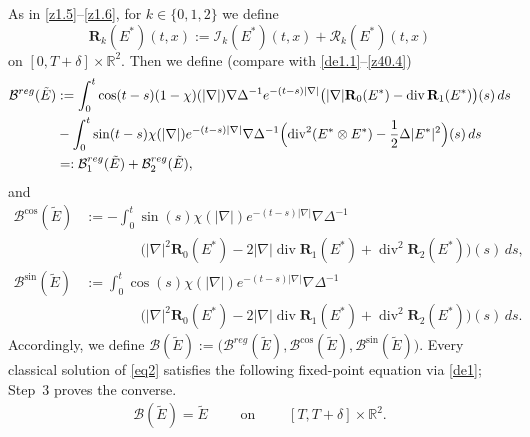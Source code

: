 \documentclass[reqno,11pt]{amsart}
\numberwithin{equation}{section}
\begin{document}
	As in \eqref{z1.5}--\eqref{z1.6}, for $k\in\{0,1,2\}$ we define
	\begin{equation}\label{sec7eq7}
		\mathbf{R}_k(E^\ast)(t,x):=\mathcal{I}_k(E^\ast)(t,x)+\mathcal{R}_k(E^\ast)(t,x)
	\end{equation}
	on $[0,T+\delta]\times\mathbb{R}^2$. Then we define (compare with \eqref{de1.1}--\eqref{z40.4})
	\begin{equation}\label{sec7eq8}
	\begin{split}
		\mathcal{B}^{reg}(\tilde E)&:=
		\int_0^t \cos(t-s)(1-\chi)(|\nabla|)\nabla\Delta^{-1}e^{-(t-s)|\nabla|}
		\bigl(|\nabla|\mathbf{R}_0(E^\ast)-\operatorname{div}\mathbf{R}_1(E^\ast)\bigr)(s)\,ds\\
		&-\int_0^t \sin(t-s)\chi(|\nabla|)e^{-(t-s)|\nabla|}\nabla\Delta^{-1}
		\Bigl(\operatorname{div}^2(E^\ast\otimes E^\ast)-\frac12\Delta |E^\ast|^2\Bigr)(s)\,ds\\
		&=:	\mathcal{B}_1^{reg}(\tilde E)+	\mathcal{B}^{reg}_2(\tilde E),
		\end{split}
	\end{equation}
	and
	\begin{equation}\label{sec7eq9}
		\begin{split}
			\mathcal{B}^{\cos}(\tilde E)&:=-\int_{0}^{t}\sin(s)\chi(|\nabla|)e^{-(t-s)|\nabla|} \nabla\Delta^{-1}\\
			&\qquad\qquad\bigl(|\nabla|^2\mathbf{R}_0( E^\ast)
			-2|\nabla|\operatorname{div}\mathbf{R}_1( E^\ast)
			+\operatorname{div}^2\mathbf{R}_2( E^\ast)\bigr)(s)\,ds,\\
			\mathcal{B}^{\sin}(\tilde E)&:=\int_{0}^{t}\cos(s)\chi(|\nabla|)e^{-(t-s)|\nabla|} \nabla\Delta^{-1}\\
			&\qquad\qquad\bigl(|\nabla|^2\mathbf{R}_0( E^\ast)
			-2|\nabla|\operatorname{div}\mathbf{R}_1( E^\ast)
			+\operatorname{div}^2\mathbf{R}_2( E^\ast)\bigr)(s)\,ds.
		\end{split}
	\end{equation}
	Accordingly, we define $\mathcal{B}(\tilde E):=\bigl(\mathcal{B}^{reg}(\tilde E),\mathcal{B}^{\cos}(\tilde E),\mathcal{B}^{\sin}(\tilde E)\bigr)$. Every classical solution of \eqref{eq2} satisfies the following fixed-point equation via \eqref{de1}; Step~3 proves the converse.
	\begin{align}\label{a14}
		\mathcal{B}(\tilde E)=\tilde E\qquad\text{ on }\qquad [T,T+\delta]\times\mathbb{R}^2.
	\end{align}
\end{document}
